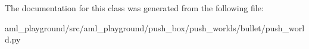 The documentation for this class was generated from the following file\-:\begin{DoxyCompactItemize}
\item 
aml\-\_\-playground/src/aml\-\_\-playground/push\-\_\-box/push\-\_\-worlds/bullet/push\-\_\-world.\-py\end{DoxyCompactItemize}

